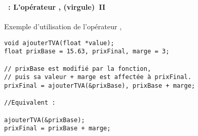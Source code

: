 \begin{frame}[containsverbatim]
  \frametitle{\secname}
  \framesubtitle{\subsecname~: L'opérateur , (virgule)~II} 

  \begin{exampleblock}{Exemple d'utilisation de l'opérateur ,}
    \begin{verbatim}
void ajouterTVA(float *value);
float prixBase = 15.63, prixFinal, marge = 3;

// prixBase est modifié par la fonction, 
// puis sa valeur + marge est affectée à prixFinal.
prixFinal = ajouterTVA(&prixBase), prixBase + marge; 
                       
//Equivalent :

ajouterTVA(&prixBase);
prixFinal = prixBase + marge;\end{verbatim}
  \end{exampleblock}    
\end{frame}

